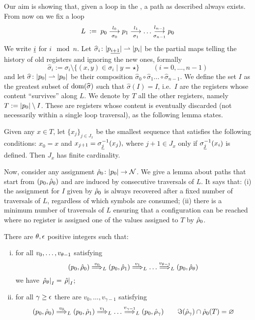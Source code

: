Our aim is showing that, given a loop in the \hdma{}, a path as described always exists. From now on we fix a loop
\[
	L \;:=\; p_0 \overset{l_0}{\underset{\sigma_0}{\longrightarrow}} p_1 \overset{l_1}{\underset{\sigma_1}{\longrightarrow}} \dots \overset{l_{n-1}}{\underset{\sigma_{n-1}}{\longrightarrow}} p_0
\]
We write ${\underline{i}}$ for $i \mod n$. Let $\widehat{\sigma}_i \colon |p_{\underline{i+1}}| \rightharpoonup |p_i|$ be the partial maps telling the history of old registers and ignoring the new ones, formally
\[
	\widehat{\sigma}_i := \sigma_i \setminus \{ (x,y) \in \sigma_i \mid y = \star \} 
	\qquad (i=0,\dots,n-1)
\]
and let $\widehat{\sigma} \colon |p_0| \rightharpoonup |p_0|$ be their composition $\widehat{\sigma}_0 \circ \widehat{\sigma}_1 \dots \circ \widehat{\sigma}_{n-1}$. We define the set $I$ as the greatest subset of $\operatorname{dom}(\widehat{\sigma})$ such that $ \widehat{\sigma}(I) = I$,
i.e.\ $I$ are the registers whose content ``survives'' along $L$. We denote by $T$ all the other registers, namely $T := |p_0| \setminus I$. These are registers whose content is eventually discarded (not necessarily within a single loop traversal), as the following lemma states.
%
%
\begin{lemma}
\label{lem:rho-forget}
Given any $x \in T$, let $\{x_j\}_{j \in J_x}$ be the smallest sequence that satisfies the following conditions:
$
	x_0 = x
$
and
$
	x_{j+1} = \sigma_{{\underline{j}}}^{-1}(x_j),
$
where $j+1 \in J_x$ only if $\sigma_{{\underline{j}}}^{-1}(x_i)$ is defined. Then $J_x$ has finite cardinality.
\end{lemma}
%
Now, consider any assignment $\hat{\rho}_0 \colon |p_0| \to \mathcal{N}$. We give a lemma about paths that start from $(p_0,\hat{\rho}_0)$ and are induced by consecutive traversals of $L$. It says that: (i) the assignment for $I$ given by $\hat{\rho}_0$ is always recovered after a fixed number of traversals of $L$, regardless of which symbols are consumed; (ii) there is a minimum number of traversals of $L$ ensuring that a configuration can be reached where no register is assigned one of the values assigned to $T$ by $\hat{\rho}_0$.
%
\begin{lemma} There are $\theta,\epsilon$ positive integers such that:
\label{lem:IT}
\begin{enumerate}[(i)]

\item
for all $v_0,\dots,v_{\theta-1}$ satisfying
\[
	(p_0,\hat{\rho}_0) \overset{v_0}{\Longrightarrow}_{L} (p_0,\hat{\rho}_1) \overset{v_1}{\Longrightarrow}_{L} \dots \overset{v_{\theta-1}}{\Longrightarrow}_{L} (p_0,\hat{\rho}_\theta)
\]
we have $\left. \hat{\rho}_\theta \right|_{I} = \left. \hat{\rho} \right|_{I}$;
\label{idI}

\item %
for all $\gamma \geq \epsilon$ there are $v_0,\dots,v_{\gamma-1}$ satisfying
\[
	(p_0,\hat{\rho}_0) \overset{v_0}{\Longrightarrow}_{L} (p_0,\hat{\rho}_1) \overset{v_1}{\Longrightarrow}_{L} \dots \overset{v_{\gamma-1}}{\Longrightarrow}_{L} (p_0,\hat{\rho}_\gamma)
	\qquad 
	\Im(\hat{\rho}_\gamma) \cap \hat{\rho}_0(T) = \varnothing
\]
\label{forgetT}
\end{enumerate}
\end{lemma}
